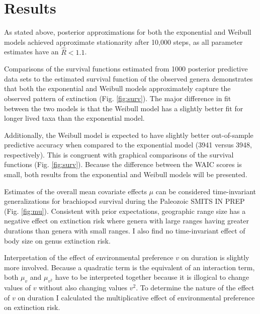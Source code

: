 \documentclass[12pt,letterpaper]{article}
\begin{document}
\section{Results}

As stated above, posterior approximations for both the exponential and Weibull models achieved approximate stationarity after 10,000 steps, as all parameter estimates have an \(\hat{R} < 1.1\).%

Comparisons of the survival functions estimated from 1000 posterior predictive data sets to the estimated survival function of the observed genera demonstrates that both the exponential and Weibull models approximately capture the observed pattern of extinction (Fig. \ref{fig:surv}). The major difference in fit between the two models is that the Weibull model has a slightly better fit for longer lived taxa than the exponential model.



Additionally, the Weibull model is expected to have slightly better out-of-sample predictive accuracy when compared to the exponential model (3941 versus 3948, respectively). This is congruent with graphical comparisons of the survival functions (Fig. \ref{fig:surv}). Because the difference between the WAIC scores is small, both results from the exponential and Weibull models will be presented.

Estimates of the overall mean covariate effects \(\mu\) can be considered time-invariant generalizations for brachiopod survival during the Paleozoic \uppercase{Smits in prep} (Fig. \ref{fig:mu}). Consistent with prior expectations, geographic range size has a negative effect on extinction risk where genera with large ranges having greater durations than genera with small ranges. I also find no time-invariant effect of body size on genus extinction risk. 

Interpretation of the effect of environmental preference \(v\) on duration is slightly more involved. Because a quadratic term is the equivalent of an interaction term, both \(\mu_{v}\) and \(\mu_{v^{2}}\) have to be interpreted together because it is illogical to change values of \(v\) without also changing values \(v^{2}\). To determine the nature of the effect of \(v\) on duration I calculated the multiplicative effect of environmental preference on extinction risk.
\end{document}
